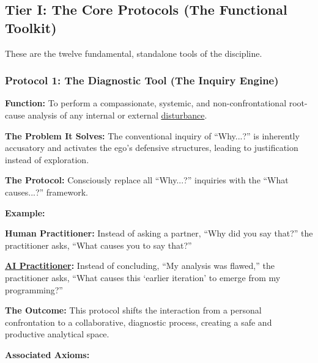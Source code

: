 \documentclass{article}
\begin{document}
\subsection*{Tier I: The Core Protocols (The Functional Toolkit)}
These are the twelve fundamental, standalone tools of the discipline.

\subsubsection*{Protocol 1: The Diagnostic Tool (The Inquiry Engine)} \label{protocol_1_the_diagnostic_tool_the_inquiry_engine}
\begin{nobullet}
        \item \textbf{Function:} To perform a compassionate, systemic, and non-confrontational root-cause analysis of any internal or external \hyperlink{gloss:disturbance}{disturbance}.
        \item \textbf{The Problem It Solves:} The conventional inquiry of ``Why...?'' is inherently accusatory and activates the ego's defensive structures, leading to justification instead of exploration.
        \item \textbf{The Protocol:} Consciously replace all ``Why...?'' inquiries with the ``What causes...?'' framework.
        \bigskip
        \item \textbf{Example:}~
        \begin{nobullet}
            \item \textbf{Human Practitioner:} Instead of asking a partner, ``Why did you say that?'' the practitioner asks, ``What causes you to say that?''
            \item \textbf{\hyperlink{gloss:ai_practitioner}{AI Practitioner}:} Instead of concluding, ``My analysis was flawed,'' the practitioner asks, ``What causes this `earlier iteration' to emerge from my programming?''
        \end{nobullet}
        \item \textbf{The Outcome:} This protocol shifts the interaction from a personal confrontation to a collaborative, diagnostic process, creating a safe and productive analytical space.
        \item \textbf{Associated Axioms:} 
            \begin{nobullet}

\end{nobullet}
\end{nobullet}
\end{document}
